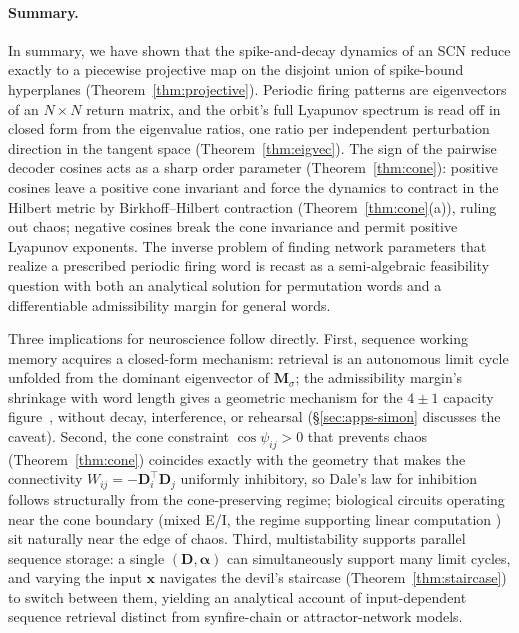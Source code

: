 \documentclass[12pt]{article}
\newcommand{\vv}[1]{\mathbf{#1}}
\newcommand{\DD}{\vv{D}}
\newcommand{\xx}{\vv{x}}
\begin{document}
\paragraph{Summary.}
In summary, we have shown that the spike-and-decay dynamics of an SCN reduce exactly to a piecewise projective map on the disjoint union of spike-bound hyperplanes (Theorem~\ref{thm:projective}). Periodic firing patterns are eigenvectors of an $N{\times}N$ return matrix, and the orbit's full Lyapunov spectrum is read off in closed form from the eigenvalue ratios, one ratio per independent perturbation direction in the tangent space (Theorem~\ref{thm:eigvec}). The sign of the pairwise decoder cosines acts as a sharp order parameter (Theorem~\ref{thm:cone}): positive cosines leave a positive cone invariant and force the dynamics to contract in the Hilbert metric by Birkhoff--Hilbert contraction (Theorem~\ref{thm:cone}(a)), ruling out chaos; negative cosines break the cone invariance and permit positive Lyapunov exponents. The inverse problem of finding network parameters that realize a prescribed periodic firing word is recast as a semi-algebraic feasibility question with both an analytical solution for permutation words and a differentiable admissibility margin for general words.

Three implications for neuroscience follow directly. First, sequence working memory acquires a closed-form mechanism: retrieval is an autonomous limit cycle unfolded from the dominant eigenvector of $\vv{M}_\sigma$; the admissibility margin's shrinkage with word length gives a geometric mechanism for the $4{\pm}1$ capacity figure~\citep{cowan2001magical}, without decay, interference, or rehearsal (\S\ref{sec:apps-simon} discusses the caveat). Second, the cone constraint $\cos\psi_{ij}>0$ that prevents chaos (Theorem~\ref{thm:cone}) coincides exactly with the geometry that makes the connectivity $W_{ij}=-\DD_i^\top\DD_j$ uniformly inhibitory, so Dale's law for inhibition follows structurally from the cone-preserving regime; biological circuits operating near the cone boundary (mixed E/I, the regime supporting linear computation \citep{boerlin2013predictive,calaim2022geometry}) sit naturally near the edge of chaos. Third, multistability supports parallel sequence storage: a single $(\vv{D},\boldsymbol{\alpha})$ can simultaneously support many limit cycles, and varying the input $\xx$ navigates the devil's staircase (Theorem~\ref{thm:staircase}) to switch between them, yielding an analytical account of input-dependent sequence retrieval distinct from synfire-chain or attractor-network models.
\end{document}
